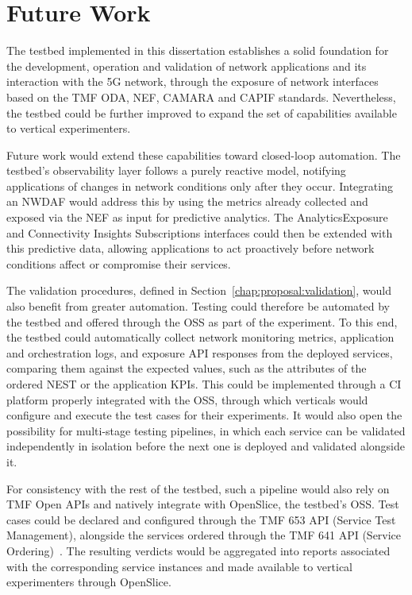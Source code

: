 \section{Future Work}
\label{chap:conclusions:future}

The testbed implemented in this dissertation establishes a solid foundation for the development, operation and validation of network applications and its interaction with the \acs{5G} network, through the exposure of network interfaces based on the \acs{TMF} \acs{ODA}, \acs{NEF}, CAMARA and \acs{CAPIF} standards. Nevertheless, the testbed could be further improved to expand the set of capabilities available to vertical experimenters.

Future work would extend these capabilities toward closed-loop automation. The testbed's observability layer follows a purely reactive model, notifying applications of changes in network conditions only after they occur. Integrating an \acs{NWDAF} would address this by using the metrics already collected and exposed via the \acs{NEF} as input for predictive analytics. The AnalyticsExposure and Connectivity Insights Subscriptions interfaces could then be extended with this predictive data, allowing applications to act proactively before network conditions affect or compromise their services.

The validation procedures, defined in Section~\ref{chap:proposal:validation}, would also benefit from greater automation. Testing could therefore be automated by the testbed and offered through the \acs{OSS} as part of the experiment. To this end, the testbed could automatically collect network monitoring metrics, application and orchestration logs, and exposure \acs{API} responses from the deployed services, comparing them against the expected values, such as the attributes of the ordered \acs{NEST} or the application \acsp{KPI}. This could be implemented through a \acs{CI} platform properly integrated with the \acs{OSS}, through which verticals would configure and execute the test cases for their experiments. It would also open the possibility for multi-stage testing pipelines, in which each service can be validated independently in isolation before the next one is deployed and validated alongside it.

For consistency with the rest of the testbed, such a pipeline would also rely on \acs{TMF} Open \acsp{API} and natively integrate with OpenSlice, the testbed's \acs{OSS}. Test cases could be declared and configured through the \acs{TMF} 653 \acs{API} (Service Test Management), alongside the services ordered through the \acs{TMF} 641 \acs{API} (Service Ordering)~\cite{openAPIsTMF}. The resulting verdicts would be aggregated into reports associated with the corresponding service instances and made available to vertical experimenters through OpenSlice.
